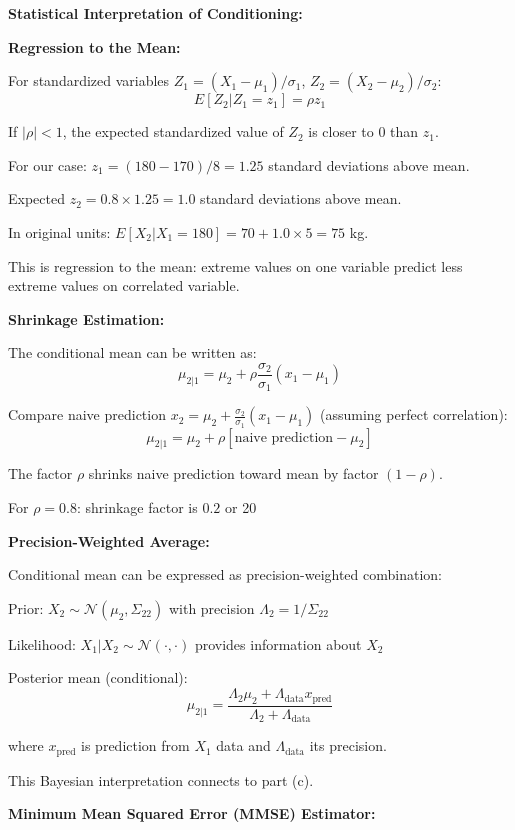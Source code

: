 \documentclass[12pt]{article}
\begin{document}
\begin{explanation}

\textbf{Statistical Interpretation of Conditioning:}

\textbf{Regression to the Mean:}

For standardized variables $Z_1 = (X_1 - \mu_1)/\sigma_1$, $Z_2 = (X_2 - \mu_2)/\sigma_2$:
\[
E[Z_2 | Z_1 = z_1] = \rho z_1
\]

If $|\rho| < 1$, the expected standardized value of $Z_2$ is closer to 0 than $z_1$.

For our case: $z_1 = (180 - 170)/8 = 1.25$ standard deviations above mean.

Expected $z_2 = 0.8 \times 1.25 = 1.0$ standard deviations above mean.

In original units: $E[X_2 | X_1 = 180] = 70 + 1.0 \times 5 = 75$ kg.

This is regression to the mean: extreme values on one variable predict less extreme values on correlated variable.

\textbf{Shrinkage Estimation:}

The conditional mean can be written as:
\[
\mu_{2|1} = \mu_2 + \rho\frac{\sigma_2}{\sigma_1}(x_1 - \mu_1)
\]

Compare naive prediction $x_2 = \mu_2 + \frac{\sigma_2}{\sigma_1}(x_1 - \mu_1)$ (assuming perfect correlation):
\[
\mu_{2|1} = \mu_2 + \rho[\text{naive prediction} - \mu_2]
\]

The factor $\rho$ shrinks naive prediction toward mean by factor $(1 - \rho)$.

For $\rho = 0.8$: shrinkage factor is $0.2$ or 20%

\textbf{Precision-Weighted Average:}

Conditional mean can be expressed as precision-weighted combination:

Prior: $X_2 \sim \mathcal{N}(\mu_2, \Sigma_{22})$ with precision $\Lambda_2 = 1/\Sigma_{22}$

Likelihood: $X_1 | X_2 \sim \mathcal{N}(\cdot, \cdot)$ provides information about $X_2$

Posterior mean (conditional):
\[
\mu_{2|1} = \frac{\Lambda_2 \mu_2 + \Lambda_{\text{data}} x_{\text{pred}}}{\Lambda_2 + \Lambda_{\text{data}}}
\]

where $x_{\text{pred}}$ is prediction from $X_1$ data and $\Lambda_{\text{data}}$ its precision.

This Bayesian interpretation connects to part (c).

\textbf{Minimum Mean Squared Error (MMSE) Estimator:}


\end{explanation}
\end{document}
